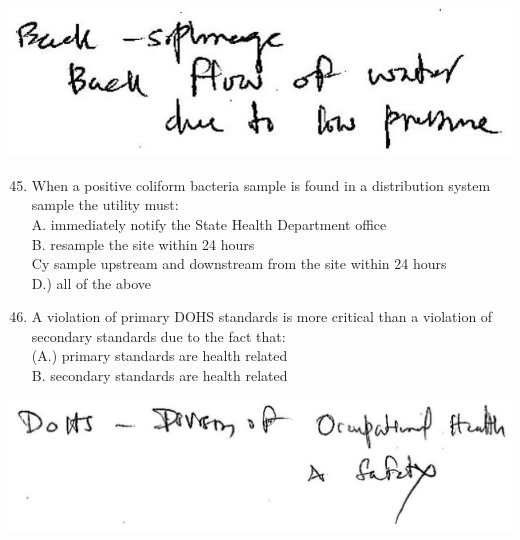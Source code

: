 \documentclass[10pt]{article}
\begin{document}
\includegraphics[max width=\textwidth]{2022_11_11_a5e8a54031fc138b833ag-6(2)}

\begin{enumerate}
  \setcounter{enumi}{44}
  \item When a positive coliform bacteria sample is found in a distribution system sample the utility must:\\
A. immediately notify the State Health Department office\\
B. resample the site within 24 hours\\
Cy sample upstream and downstream from the site within 24 hours\\
D.) all of the above

  \item A violation of primary DOHS standards is more critical than a violation of secondary standards due to the fact that:\\
(A.) primary standards are health related\\
B. secondary standards are health related

\end{enumerate}

\includegraphics[max width=\textwidth]{2022_11_11_a5e8a54031fc138b833ag-6(3)}
\end{document}
